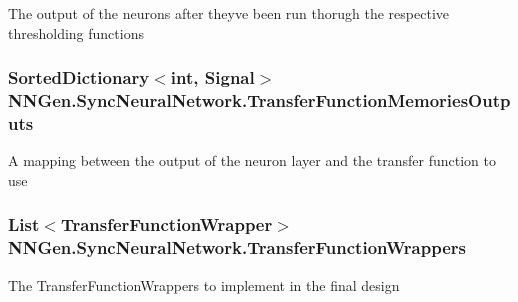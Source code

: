 The output of the neurons after they\textquotesingle{}ve been run thorugh the respective thresholding functions 

\hypertarget{class_n_n_gen_1_1_sync_neural_network_a76ca03cc953d58f1b392cb723fe3e86a}{}
\subsubsection[{Transfer\+Function\+Memories\+Outputs}]{\setlength{\rightskip}{0pt plus 5cm}Sorted\+Dictionary$<$int, {\bf Signal}$>$ N\+N\+Gen.\+Sync\+Neural\+Network.\+Transfer\+Function\+Memories\+Outputs\hspace{0.3cm}{\ttfamily [get]}}\label{class_n_n_gen_1_1_sync_neural_network_a76ca03cc953d58f1b392cb723fe3e86a}


A mapping between the output of the neuron layer and the transfer function to use 

\hypertarget{class_n_n_gen_1_1_sync_neural_network_ad94e116de1c91c9e5f6deb61df5bb23f}{}
\subsubsection[{Transfer\+Function\+Wrappers}]{\setlength{\rightskip}{0pt plus 5cm}List$<${\bf Transfer\+Function\+Wrapper}$>$ N\+N\+Gen.\+Sync\+Neural\+Network.\+Transfer\+Function\+Wrappers\hspace{0.3cm}{\ttfamily [get]}}\label{class_n_n_gen_1_1_sync_neural_network_ad94e116de1c91c9e5f6deb61df5bb23f}


The Transfer\+Function\+Wrappers to implement in the final design 

\hypertarget{class_n_n_gen_1_1_sync_neural_network_a5d11d979c5498deaa585533ef25883ce}{}
